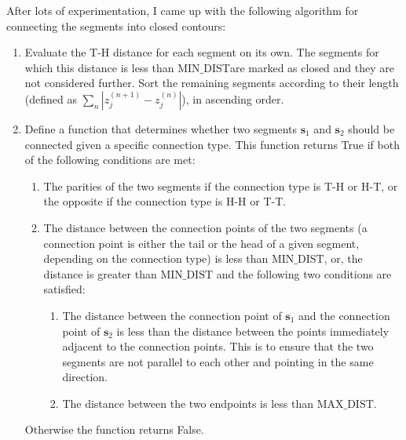 \documentclass[12pt,dvipsnames]{report}
\newcommand{\ssf}[1]{\textsf{#1}}
\begin{document}
After lots of experimentation,
I came up with the following algorithm for connecting the segments into closed contours:
\begin{enumerate}
    \item Evaluate the T-H distance for each segment on its own. The segments for which
    this distance is less than $\text{MIN\_DIST}$are marked as closed and they are not 
    considered further. Sort the remaining segments according to  their length (defined as 
    $\sum_n \left|z^{(n+1)}_j - z^{(n)}_j \right|$), in ascending order. 
    \item Define a function that determines whether two segments $\mathbf{s}_1$ and 
    $\mathbf{s}_2$ should be connected given a specific connection type. This function
    returns \ssf{True} if both of the following conditions are met:
    \begin{enumerate}
        \item The parities of the two segments if the connection type is T-H or H-T, or 
        the opposite if the connection type is H-H or T-T.
        \item The distance between the connection points
        of the two segments (a connection point is either the tail or the head of a given segment,
        depending on the connection type) is less than $\text{MIN\_DIST}$, or, the distance
        is greater than $\text{MIN\_DIST}$ and the following two conditions are satisfied:
        \begin{enumerate}
        \item The distance between the connection point of $\mathbf{s}_1$ and the connection 
        point of $\mathbf{s}_2$ is less than the distance between the points 
        immediately adjacent to the connection points. This is to ensure that the two 
        segments are not parallel to each other and pointing in the same direction.
        \item The distance between the two endpoints is less than $\text{MAX\_DIST}$.
        \end{enumerate}
            \end{enumerate}
    Otherwise the function returns \ssf{False}.


\end{enumerate}
\end{document}
